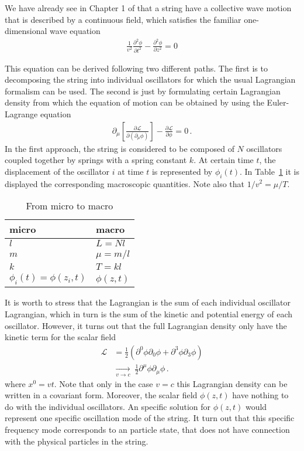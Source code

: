 \begin{frame}
We have already see in Chapter 1 of \cite{lsm} that a string have a collective wave motion that is described by a continuous field, which satisfies the familiar one-dimensional wave equation
\begin{align}
\label{eq:2}
  \frac{1}{v^2}\frac{\partial^2\phi}{\partial t^2}-\frac{\partial^2\phi}{\partial z^2}=0
\end{align}
\end{frame}
This equation can be derived following two different paths. The first is to decomposing the string into individual oscillators for which the usual Lagrangian formalism can be used. The second is just by formulating certain Lagrangian density from which the equation of motion can be obtained  by using the Euler-Lagrange equation
\begin{align}
  \partial_\mu\left[\frac{\partial\mathcal{L}}{\partial(\partial_\mu\phi)}\right]-\frac{\partial\mathcal{L}}{\partial\phi}=0\,.
\end{align}
In the first approach, the string is considered to be composed of $N$ oscillators coupled together  by springs with a spring constant $k$. At certain time $t$, the displacement of the oscillator $i$ at time $t$ is represented by $\phi_i(t)$. In Table~\ref{tab:1} it is displayed the corresponding macroscopic quantities. Note also that $1/v^2=\mu/T$.
\begin{table}[htp!]
  \centering
  \begin{tabular}{l|l}
    micro & macro \\\hline{}
    $l$ & $L=N l$\\
    $m$ & $\mu=m/l$ \\
    $k$ & $T=k l$\\
    $\phi_i(t)=\phi(z_i,t)$ &  $\phi(z,t)$\\
  \end{tabular}
  \caption{From micro to macro}
\label{tab:1}
\end{table}
It is worth to stress that the Lagrangian is the sum of each individual oscillator Lagrangian, which in turn is the sum of the kinetic and potential energy  of each oscillator. However, it turns out that the full Lagrangian density only have the kinetic term for the scalar field
\begin{align}
  \mathcal{L}&=\frac{1}{2}\left(\partial^0\phi\partial_0\phi+\partial^3\phi\partial_3\phi\right)\nonumber\\
  &\underset{v\to c}{\longrightarrow}\;\tfrac{1}{2}\partial^\mu\phi\partial_\mu\phi\,.
\end{align}
where $x^0=vt$. Note that only in the case $v=c$ this Lagrangian density can be written in a covariant form. Moreover, the scalar field $\phi(z,t)$ have nothing to do with the individual oscillators. An specific solution for $\phi(z,t)$ would represent one specific oscillation mode of the string. It turn out that  this specific frequency mode corresponds to an particle state, that does not have connection with the physical particles in the string. 

